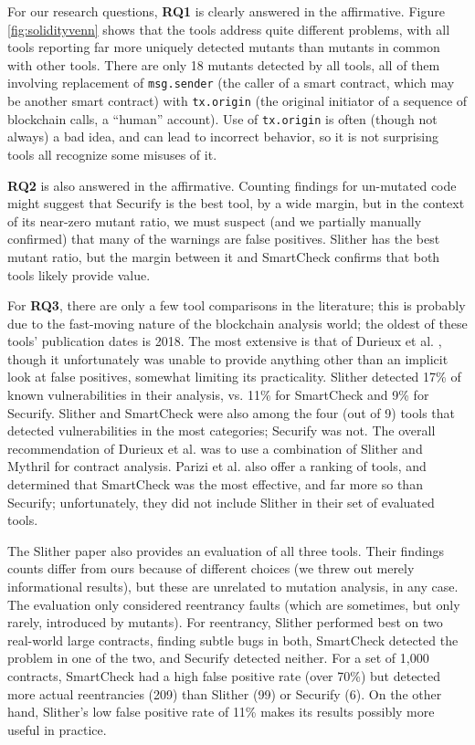 For our research questions, {\bf RQ1} is clearly answered in the affirmative.  Figure \ref{fig:solidityvenn} shows that the tools address quite different problems, with all tools reporting far more uniquely detected mutants than mutants in common with other tools.  There are only 18 mutants detected by all tools, all of them involving replacement of {\tt msg.sender} (the caller of a smart contract, which may be another smart contract) with {\tt tx.origin} (the original initiator of a sequence of blockchain calls, a ``human'' account).  Use of {\tt tx.origin} is often (though not always) a bad idea, and can lead to incorrect behavior, so it is not surprising tools all recognize some misuses of it.

{\bf RQ2} is also answered in the affirmative.  Counting findings for un-mutated code might suggest that Securify is the best tool, by a wide margin, but in the context of its near-zero mutant ratio, we must suspect (and we partially manually confirmed) that many of the warnings are false positives.  Slither has the best mutant ratio, but the margin between it and SmartCheck confirms that both tools likely provide value.

For {\bf RQ3}, there are only a few tool comparisons in the literature; this is probably due to the fast-moving nature of the blockchain analysis world; the oldest of these tools' publication dates is 2018.  The most extensive is that of Durieux et al. \cite{durieux2019empirical}, though it unfortunately was unable to provide anything other than an implicit look at false positives, somewhat limiting its practicality.  Slither detected 17\% of known vulnerabilities in their analysis, vs. 11\% for SmartCheck and 9\% for Securify. Slither and SmartCheck were also among the four (out of 9) tools that detected vulnerabilities in the most categories; Securify was not.  The overall recommendation of Durieux et al. was to use a combination of Slither and Mythril \cite{mythril-code} for contract analysis.  Parizi et al. \cite{Parizi} also offer a ranking of tools, and determined that SmartCheck was the most effective, and far more so than Securify; unfortunately, they did not include Slither in their set of evaluated tools.

The Slither paper \cite{slither} also provides an evaluation of all three tools.  Their findings counts differ from ours because of different choices (we threw out merely informational results), but these are unrelated to mutation analysis, in any case.  The evaluation only considered reentrancy faults \cite{SurveyAttacks,FC20} (which are sometimes, but only rarely, introduced by mutants).  For reentrancy, Slither performed best on two real-world large contracts, finding subtle bugs in both, SmartCheck detected the problem in one of the two, and Securify detected neither.  For a set of 1,000 contracts, SmartCheck had a high false positive rate (over 70\%) but detected more actual reentrancies (209) than Slither (99) or Securify (6).  On the other hand, Slither's low false positive rate of 11\%  makes its results possibly more useful in practice.


